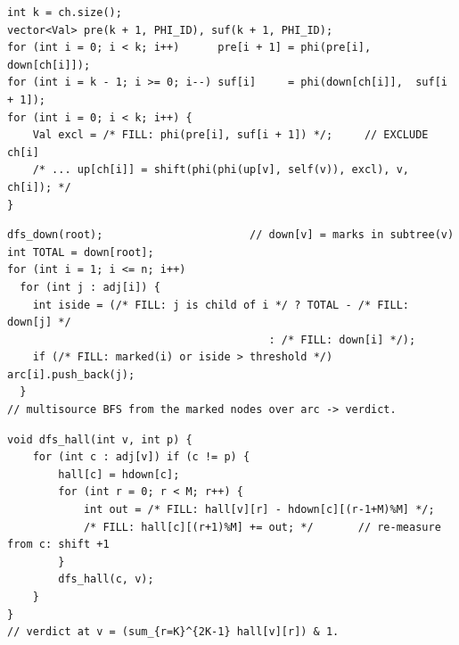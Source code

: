 \begin{lstlisting}[caption={Drill 3 -- prefix/suffix exclusive combine (from \coderef{c20-presuf})}]
int k = ch.size();
vector<Val> pre(k + 1, PHI_ID), suf(k + 1, PHI_ID);
for (int i = 0; i < k; i++)      pre[i + 1] = phi(pre[i],       down[ch[i]]);
for (int i = k - 1; i >= 0; i--) suf[i]     = phi(down[ch[i]],  suf[i + 1]);
for (int i = 0; i < k; i++) {
    Val excl = /* FILL: phi(pre[i], suf[i + 1]) */;     // EXCLUDE ch[i]
    /* ... up[ch[i]] = shift(phi(phi(up[v], self(v)), excl), v, ch[i]); */
}
\end{lstlisting}

\begin{lstlisting}[caption={Drill 4 -- count reroot feeding a directed verdict (from \coderef{c20-count})}]
dfs_down(root);                       // down[v] = marks in subtree(v)
int TOTAL = down[root];
for (int i = 1; i <= n; i++)
  for (int j : adj[i]) {
    int iside = (/* FILL: j is child of i */ ? TOTAL - /* FILL: down[j] */
                                         : /* FILL: down[i] */);
    if (/* FILL: marked(i) or iside > threshold */) arc[i].push_back(j);
  }
// multisource BFS from the marked nodes over arc -> verdict.
\end{lstlisting}

\begin{lstlisting}[caption={Drill 5 -- Summit width-2k histogram transfer (from \coderef{c20-summit})}]
void dfs_hall(int v, int p) {
    for (int c : adj[v]) if (c != p) {
        hall[c] = hdown[c];
        for (int r = 0; r < M; r++) {
            int out = /* FILL: hall[v][r] - hdown[c][(r-1+M)%M] */;
            /* FILL: hall[c][(r+1)%M] += out; */       // re-measure from c: shift +1
        }
        dfs_hall(c, v);
    }
}
// verdict at v = (sum_{r=K}^{2K-1} hall[v][r]) & 1.
\end{lstlisting}
\noindent{\scriptsize Key: the up-transfer of a \emph{distance histogram} is a cyclic
shift by $1$ (move the root across one edge changes every distance by $\pm1$),
exactly \thmref{c20-edge-transfer}'s $\mathit{shift}$ specialised to residue mod $2k$.
The parity of the $[k,2k)$ band is the Nim verdict (\probref{c20-summit}).}

